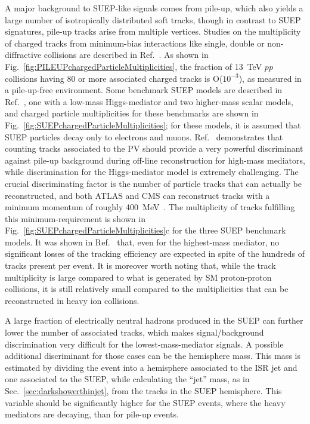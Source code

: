 A major background to SUEP-like signals comes from pile-up, which also yields a large number of isotropically distributed soft tracks, though in contrast to SUEP signatures, pile-up tracks arise from multiple vertices. Studies on the multiplicity of charged tracks from minimum-bias interactions like single, double or non-diffractive collisions are described in Ref.~\cite{Aad:2016mok}. As shown in Fig.~\ref{fig:PILEUPchargedParticleMultiplicities}, the fraction of 13~TeV $pp$ collisions having 80 or more associated charged tracks is O($10^{-3}$), as measured in a pile-up-free environment. Some benchmark SUEP models are described in Ref.~\cite{Knapen:2016hky}, one with a low-mass Higgs-mediator and two higher-mass scalar models, and charged particle multiplicities for these benchmarks are shown in Fig.~\ref{fig:SUEPchargedParticleMultiplicities}; for these models, it is assumed that SUEP particles decay only  to electrons and muons. Ref.~\cite{Knapen:2016hky} demonstrates that counting tracks associated to the PV should provide a very powerful discriminant against pile-up background during off-line reconstruction for high-mass mediators, while discrimination for the Higgs-mediator model is extremely challenging. The crucial discriminating factor is the number of particle tracks that can actually be reconstructed, and both ATLAS and CMS can reconstruct tracks with a minimum momentum of roughly 400~MeV~\cite{Sirunyan:2017ulk}. The multiplicity of tracks fulfilling this minimum-\pt requirement is shown in Fig.~\ref{fig:SUEPchargedParticleMultiplicities}c for the three SUEP benchmark models. It was shown in Ref.~\cite{Knapen:2016hky} that, even for the highest-mass mediator, no significant losses of the tracking efficiency are expected  in spite of the hundreds of tracks present per event. It is moreover worth noting that, while the track multiplicity is large compared to what is generated by SM proton-proton collisions, it is still relatively small compared to the multiplicities that can be reconstructed in heavy ion collisions. 

A large fraction of electrically neutral hadrons produced in the SUEP can further lower the number of associated tracks, which makes signal/background discrimination very difficult for the lowest-mass-mediator signals. A possible additional discriminant for those cases can be the hemisphere mass. This mass is estimated by dividing the event into a hemisphere associated to the ISR jet and one associated to the SUEP, while calculating the ``jet'' mass, as in Sec.~\ref{sec:darkshowerthinjet}, from the tracks in the SUEP hemisphere. This variable should be significantly higher for the SUEP events, where the heavy mediators are decaying, than for pile-up events.

